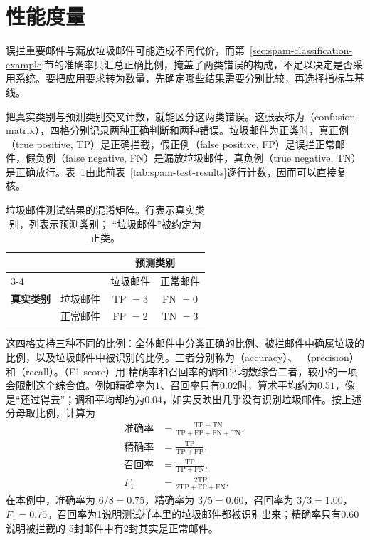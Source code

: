 \section{性能度量}
\label{sec:performance-measures}

误拦重要邮件与漏放垃圾邮件可能造成不同代价，而第~\ref{sec:spam-classification-example}节的准确率只汇总正确比例，掩盖了两类错误的构成，不足以决定是否采用系统。要把应用要求转为数量，先确定哪些结果需要分别比较，再选择指标与基线。

把真实类别与预测类别交叉计数，就能区分这两类错误。这张表称为（confusion matrix），四格分别记录两种正确判断和两种错误。垃圾邮件为正类时，真正例（true positive, TP）是正确拦截，假正例（false positive, FP）是误拦正常邮件，假负例（false negative, FN）是漏放垃圾邮件，真负例（true negative, TN）是正确放行。表~\ref{tab:spam-confusion-matrix}由此前表~\ref{tab:spam-test-results}逐行计数，因而可以直接复核。

\begin{table}[htbp]
  \centering
  \small
  \begin{tabular}{@{}llcc@{}}
    \toprule
    & & \multicolumn{2}{c}{\textbf{预测类别}} \\
    \cmidrule(l){3-4}
    & & 垃圾邮件 & 正常邮件 \\
    \midrule
    \textbf{真实类别} & 垃圾邮件 & TP $=3$ & FN $=0$ \\
                    & 正常邮件 & FP $=2$ & TN $=3$ \\
    \bottomrule
  \end{tabular}
  \caption{垃圾邮件测试结果的混淆矩阵。行表示真实类别，列表示预测类别；
  “垃圾邮件”被约定为正类。}
  \label{tab:spam-confusion-matrix}
\end{table}

这四格支持三种不同的比例：全体邮件中分类正确的比例、被拦邮件中确属垃圾的比例，以及垃圾邮件中被识别的比例。三者分别称为（accuracy）、
（precision）和（recall）。（F1 score）用
精确率和召回率的调和平均数综合二者，较小的一项会限制这个综合值。例如精确率为$1$、召回率只有$0.02$时，算术平均约为$0.51$，像是“还过得去”；调和平均却约为$0.04$，如实反映出几乎没有识别垃圾邮件。按上述分母取比例，计算为
\begin{align}
  \text{准确率}
    &=\frac{\mathrm{TP}+\mathrm{TN}}
      {\mathrm{TP}+\mathrm{FP}+\mathrm{FN}+\mathrm{TN}},\\
  \text{精确率}
    &=\frac{\mathrm{TP}}{\mathrm{TP}+\mathrm{FP}},\\
  \text{召回率}
    &=\frac{\mathrm{TP}}{\mathrm{TP}+\mathrm{FN}},\\
  F_1
    &=\frac{2\mathrm{TP}}{2\mathrm{TP}+\mathrm{FP}+\mathrm{FN}}.
  \label{eq:classification-measures}
\end{align}
在本例中，准确率为 $6/8=0.75$，精确率为 $3/5=0.60$，召回率为 $3/3=1.00$，
$F_1=0.75$。召回率为1说明测试样本里的垃圾邮件都被识别出来；精确率只有0.60说明被拦截的
5封邮件中有2封其实是正常邮件。

